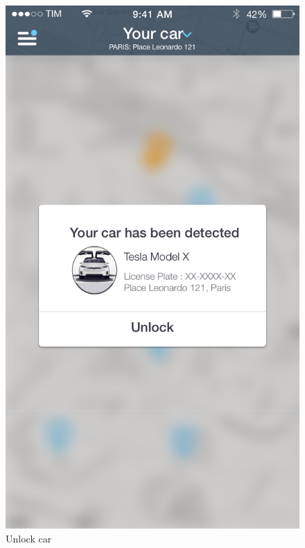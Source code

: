\documentclass[12pt]{article}
\begin{document}
 	 	\begin{figure}
		 \centering	
		 \includegraphics[scale=0.25]{Images/mobileApp/Sblocca.png}
		 \caption{Unlock car}
		 \endminipage
		 \centering

\end{figure}
\end{document}
